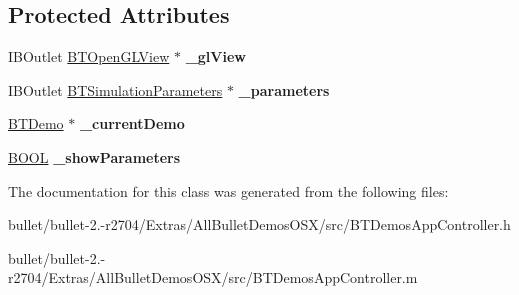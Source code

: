 \subsection*{Protected Attributes}
\begin{DoxyCompactItemize}
\item 
\hypertarget{interface_b_t_demos_app_controller_ae07d3a78e08910b0d9428bf13a525fc8}{I\+B\+Outlet \hyperlink{interface_b_t_open_g_l_view}{B\+T\+Open\+G\+L\+View} $\ast$ {\bfseries \+\_\+gl\+View}}\label{interface_b_t_demos_app_controller_ae07d3a78e08910b0d9428bf13a525fc8}

\item 
\hypertarget{interface_b_t_demos_app_controller_a0925fa03fb95086d21f83ad1ba25422e}{I\+B\+Outlet \hyperlink{interface_b_t_simulation_parameters}{B\+T\+Simulation\+Parameters} $\ast$ {\bfseries \+\_\+parameters}}\label{interface_b_t_demos_app_controller_a0925fa03fb95086d21f83ad1ba25422e}

\item 
\hypertarget{interface_b_t_demos_app_controller_aef2fa69a30b8981f4825d3eee393a239}{\hyperlink{interface_b_t_demo}{B\+T\+Demo} $\ast$ {\bfseries \+\_\+current\+Demo}}\label{interface_b_t_demos_app_controller_aef2fa69a30b8981f4825d3eee393a239}

\item 
\hypertarget{interface_b_t_demos_app_controller_a7f365d83116b7f4c0006b9c9ca8b527f}{\hyperlink{_ice_types_8h_a050c65e107f0c828f856a231f4b4e788}{B\+O\+O\+L} {\bfseries \+\_\+show\+Parameters}}\label{interface_b_t_demos_app_controller_a7f365d83116b7f4c0006b9c9ca8b527f}

\end{DoxyCompactItemize}


The documentation for this class was generated from the following files\+:\begin{DoxyCompactItemize}
\item 
bullet/bullet-\/2.-\/r2704/\+Extras/\+All\+Bullet\+Demos\+O\+S\+X/src/B\+T\+Demos\+App\+Controller.\+h\item 
bullet/bullet-\/2.-\/r2704/\+Extras/\+All\+Bullet\+Demos\+O\+S\+X/src/B\+T\+Demos\+App\+Controller.\+m\end{DoxyCompactItemize}
